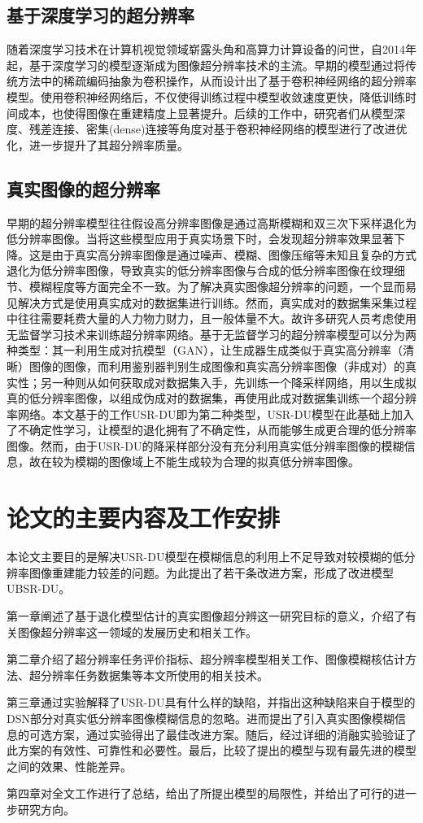 \subsection{基于深度学习的超分辨率}
随着深度学习技术在计算机视觉领域崭露头角和高算力计算设备的问世，自2014年起，基于深度学习的模型逐渐成为图像超分辨率技术的主流。早期的模型通过将传统方法中的稀疏编码抽象为卷积操作，从而设计出了基于卷积神经网络的超分辨率模型。使用卷积神经网络后，不仅使得训练过程中模型收敛速度更快，降低训练时间成本，也使得图像在重建精度上显著提升。后续的工作中，研究者们从模型深度、残差连接、密集(dense)连接等角度对基于卷积神经网络的模型进行了改进优化，进一步提升了其超分辨率质量。

\subsection{真实图像的超分辨率}
早期的超分辨率模型往往假设高分辨率图像是通过高斯模糊和双三次下采样退化为低分辨率图像。当将这些模型应用于真实场景下时，会发现超分辨率效果显著下降。这是由于真实高分辨率图像是通过噪声、模糊、图像压缩等未知且复杂的方式退化为低分辨率图像，导致真实的低分辨率图像与合成的低分辨率图像在纹理细节、模糊程度等方面完全不一致。为了解决真实图像超分辨率的问题，一个显而易见解决方式是使用真实成对的数据集进行训练。然而，真实成对的数据集采集过程中往往需要耗费大量的人力物力财力，且一般体量不大。故许多研究人员考虑使用无监督学习技术来训练超分辨率网络。基于无监督学习的超分辨率模型可以分为两种类型：其一利用生成对抗模型（GAN），让生成器生成类似于真实高分辨率（清晰）图像的图像，而利用鉴别器判别生成图像和真实高分辨率图像（非成对）的真实性；另一种则从如何获取成对数据集入手，先训练一个降采样网络，用以生成拟真的低分辨率图像，以组成伪成对的数据集，再使用此成对数据集训练一个超分辨率网络。本文基于的工作USR-DU即为第二种类型，USR-DU模型在此基础上加入了不确定性学习，让模型的退化拥有了不确定性，从而能够生成更合理的低分辨率图像。然而，由于USR-DU的降采样部分没有充分利用真实低分辨率图像的模糊信息，故在较为模糊的图像域上不能生成较为合理的拟真低分辨率图像。

\section{论文的主要内容及工作安排}
本论文主要目的是解决USR-DU模型在模糊信息的利用上不足导致对较模糊的低分辨率图像重建能力较差的问题。为此提出了若干条改进方案，形成了改进模型UBSR-DU。

第一章阐述了基于退化模型估计的真实图像超分辨这一研究目标的意义，介绍了有关图像超分辨率这一领域的发展历史和相关工作。

第二章介绍了超分辨率任务评价指标、超分辨率模型相关工作、图像模糊核估计方法、超分辨率任务数据集等本文所使用的相关技术。

第三章通过实验解释了USR-DU具有什么样的缺陷，并指出这种缺陷来自于模型的DSN部分对真实低分辨率图像模糊信息的忽略。进而提出了引入真实图像模糊信息的可选方案，通过实验得出了最佳改进方案。随后，经过详细的消融实验验证了此方案的有效性、可靠性和必要性。最后，比较了提出的模型与现有最先进的模型之间的效果、性能差异。

第四章对全文工作进行了总结，给出了所提出模型的局限性，并给出了可行的进一步研究方向。